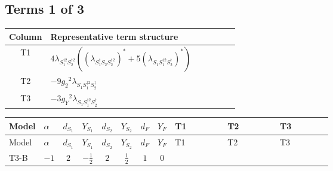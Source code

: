 \documentclass[8pt]{article}
\begin{document}
\begin{landscape}
\subsection*{Terms 1 of 3}
\begin{center}
\begin{tabular}{@{}c >{\raggedright\arraybackslash}p{0.82\linewidth}@{}}
\toprule
Column & Representative term structure \\
\midrule
T1 & \(\displaystyle 4 {\lambda_{S_1^{\dagger 2}S_2^{\dagger 2}}} (\left({\lambda_{S_1^\dagger S_2 S_2^{\dagger 2}}}\right)^{*}+5 \left({\lambda_{S_1 S_1^{\dagger 2}S_2^\dagger}}\right)^{*})\) \\
\midrule
T2 & \(\displaystyle -9 {g_2}^2 {\lambda_{S_1 S_1^{\dagger 2}S_2^\dagger}}\) \\
\midrule
T3 & \(\displaystyle -3 {g_Y}^2 {\lambda_{S_1 S_1^{\dagger 2}S_2^\dagger}}\) \\
\midrule
\bottomrule
\end{tabular}
\end{center}
\smallskip
\tiny
\begin{longtable}{@{}llcccccc >{\raggedright\arraybackslash}p{0.21\linewidth} >{\raggedright\arraybackslash}p{0.21\linewidth} >{\raggedright\arraybackslash}p{0.21\linewidth}@{}}
\toprule
Model & $\alpha$ & $d_{S_1}$ & $Y_{S_1}$ & $d_{S_2}$ & $Y_{S_2}$ & $d_F$ & $Y_F$ & T1 & T2 & T3 \\
\midrule
\endfirsthead
\toprule
Model & $\alpha$ & $d_{S_1}$ & $Y_{S_1}$ & $d_{S_2}$ & $Y_{S_2}$ & $d_F$ & $Y_F$ & T1 & T2 & T3 \\
\midrule
\endhead
T3-B & $-1$ & $2$ & $-\frac{1}{2}$ & $2$ & $\frac{1}{2}$ & $1$ & $0$ & \scriptsize\adjustbox{max width=\linewidth}{$\begin{gathered} 4 {\lambda_{S_1^{\dagger 2}S_2^{\dagger 2}}} (\left({\lambda_{S_1^\dagger S_2 S_2^{\dagger 2}}}\right)^{*}+5 \left({\lambda_{S_1 S_1^{\dagger 2}S_2^\dagger}}\right)^{*})\end{gathered}$} & \scriptsize\adjustbox{max width=\linewidth}{$\begin{gathered} -9 {g_2}^2 {\lambda_{S_1 S_1^{\dagger 2}S_2^\dagger}}\end{gathered}$} & \scriptsize\adjustbox{max width=\linewidth}{$\begin{gathered} -3 {g_Y}^2 {\lambda_{S_1 S_1^{\dagger 2}S_2^\dagger}}\end{gathered}$} \\
\midrule

\end{longtable}
\end{landscape}
\end{document}
